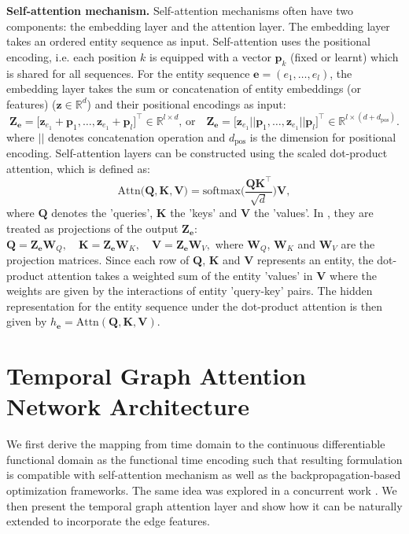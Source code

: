 \documentclass{article} %
\newcommand{\zbf}{\mathbf{z}}
\newcommand{\ebf}{\mathbf{e}}
\newcommand{\Qbf}{\mathbf{Q}}
\newcommand{\Kbf}{\mathbf{K}}
\newcommand{\Vbf}{\mathbf{V}}
\newcommand{\Wbf}{\mathbf{W}}
\begin{document}
\textbf{Self-attention mechanism.} Self-attention mechanisms often have two components: the embedding layer and the attention layer. The embedding layer takes an ordered entity sequence as input. Self-attention uses the positional encoding, i.e. each position $k$ is equipped with a vector $\mathbf{p}_k$ (fixed or learnt) which is shared for all sequences. For the entity sequence $\ebf=(e_1, \ldots, e_l)$, the embedding layer takes the sum or concatenation of entity embeddings (or features) ($\zbf \in \mathbb{R}^d$) and their positional encodings as input:
\begin{equation}
\label{eqn:attn-emb}
\mathbf{Z}_{\ebf} = \big[\zbf_{e_1} + \mathbf{p}_1, \ldots, \zbf_{e_1} + \mathbf{p}_l\big]^{\intercal} \in \mathbb{R}^{l \times d}, \, \text{or} \quad \mathbf{Z}_{\ebf} = \big[\zbf_{e_1} || \mathbf{p}_1, \ldots, \zbf_{e_1} || \mathbf{p}_l \big]^{\intercal} \in \mathbb{R}^{l \times (d+d_{\text{pos}})}.
\end{equation}
where $||$ denotes concatenation operation and $d_{\text{pos}}$ is the dimension for positional encoding.
Self-attention layers can be constructed using the scaled dot-product attention, which is defined as:
\begin{equation}
\label{eqn:attn-layer}
    \text{Attn}\big(\Qbf, \Kbf, \Vbf \big) = \text{softmax}\Big(\frac{\Qbf \Kbf^{\intercal}}{\sqrt{d}} \Big)\Vbf,
\end{equation}
where $\Qbf$ denotes the 'queries', $\Kbf$ the 'keys' and $\Vbf$ the 'values'. In \cite{vaswani2017attention}, they are treated as projections of the output $\mathbf{Z}_{\ebf}$:
$
\Qbf = \mathbf{Z}_{\ebf} \Wbf_{Q}, \quad \Kbf = \mathbf{Z}_{\ebf} \Wbf_{K}, \quad \Vbf = \mathbf{Z}_{\ebf} \Wbf_{V},
$
where $\Wbf_{Q}$, $\Wbf_{K}$ and $\Wbf_{V}$ are the projection matrices.
Since each row of $\Qbf$, $\Kbf$ and $\Vbf$ represents an entity, the dot-product attention takes a weighted sum of the entity 'values' in $\Vbf$ where the weights are given by the interactions of entity 'query-key' pairs. The hidden representation for the entity sequence under the dot-product attention is then given by $h_{\ebf}=\text{Attn}(\Qbf, \Kbf, \Vbf)$.





\section{Temporal Graph Attention Network Architecture}
\label{sec:architect}
We first derive the mapping from time domain to the continuous differentiable functional domain as the functional time encoding such that resulting formulation is compatible with self-attention mechanism as well as the backpropagation-based optimization frameworks. The same idea was explored in a concurrent work \citep{xu2019self}. We then present the temporal graph attention layer and show how it can be naturally extended to incorporate the edge features.
\end{document}
